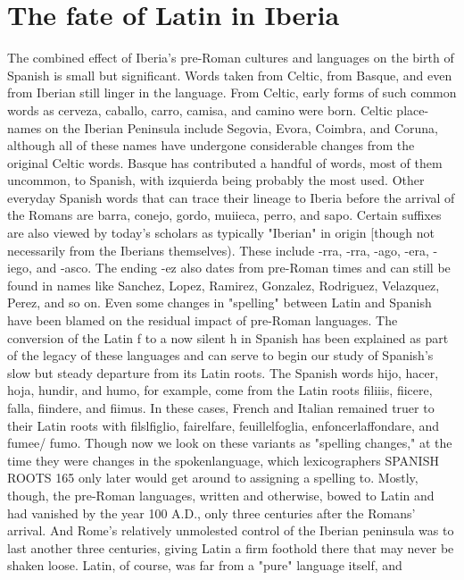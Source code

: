 \section{The fate of Latin in Iberia}

The combined effect of Iberia's pre-Roman cultures and languages on the birth of Spanish is small but significant. Words taken
from Celtic, from Basque, and even from Iberian still linger in the language. From Celtic, early forms of such common words as cerveza, caballo, carro, camisa, and camino were born. Celtic place-names on
the Iberian Peninsula include Segovia, Evora, Coimbra, and Coruna, although all of these names have undergone considerable changes from
the original Celtic words. Basque has contributed a handful of words,
most of them uncommon, to Spanish, with izquierda being probably
the most used.
Other everyday Spanish words that can trace their lineage to
Iberia before the arrival of the Romans are barra, conejo, gordo, muiieca, perro, and sapo. Certain suffixes are also viewed by today's scholars as typically "Iberian" in origin [though not necessarily from the
Iberians themselves). These include -rra, -rra, -ago, -era, -iego, and
-asco. The ending -ez also dates from pre-Roman times and can still
be found in names like Sanchez, Lopez, Ramirez, Gonzalez, Rodriguez,
Velazquez, Perez, and so on.
Even some changes in "spelling" between Latin and Spanish
have been blamed on the residual impact of pre-Roman languages. The
conversion of the Latin f to a now silent h in Spanish has been explained as part of the legacy of these languages and can serve to begin
our study of Spanish's slow but steady departure from its Latin roots.
The Spanish words hijo, hacer, hoja, hundir, and humo, for example,
come from the Latin roots filiiis, fiicere, falla, fiindere, and fiimus. In
these cases, French and Italian remained truer to their Latin roots with
filslfiglio, fairelfare, feuillelfoglia, enfoncerlaffondare, and fumee/
fumo. Though now we look on these variants as "spelling changes," at
the time they were changes in the spokenlanguage, which lexicographers
SPANISH ROOTS 165
only later would get around to assigning a spelling to. Mostly, though,
the pre-Roman languages, written and otherwise, bowed to Latin and
had vanished by the year 100 A.D., only three centuries after the Romans' arrival. And Rome's relatively unmolested control of the Iberian
peninsula was to last another three centuries, giving Latin a firm foothold there that may never be shaken loose.
Latin, of course, was far from a "pure" language itself, and
